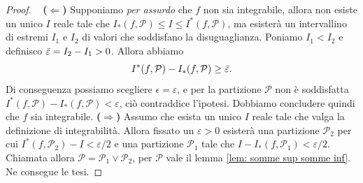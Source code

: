 \documentclass[10pt]{article}
\theoremstyle{plain}
\theoremstyle{definition}
\begin{document}
 \begin{proof} \
 \newline
 \textbf{($\Leftarrow$)} Supponiamo \textit{per assurdo} che $f$ non sia integrabile, allora non esiste un unico $I$ reale tale che $I_*(f,\mathcal{P})\leq I \leq I^*(f,\mathcal{P})$, ma esisterà un intervallino di estremi $I_1$ e $I_2$ di valori che soddisfano la disuguaglianza. Poniamo $I_1<I_2$ e definisco $\Bar{\varepsilon}=I_2-I_1>0$. Allora abbiamo
 $$ I^*(f,\mathcal{P})- I_*(f,\mathcal{P})\geq \Bar{\varepsilon}.$$ Di conseguenza possiamo scegliere $\epsilon=\varepsilon$, e per la partizione $\mathcal{P}$ non è soddisfatta $I^*(f,\mathcal{P})-I_*(f,\mathcal{P})<\varepsilon$, ciò contraddice l'ipotesi. Dobbiamo concludere quindi che $f$ sia integrabile.
\newline
 \textbf{($\Rightarrow$)} Assumo che esista un unico $I$ reale tale che valga la definizione di integrabilità. Allora fissato un $\varepsilon >0$ esisterà una partizione $\mathcal{P}_2$ per cui $I^*(f,\mathcal{P}_2)-I<\varepsilon/2$ e una partizione $\mathcal{P}_1$ tale che $I-I_*(f,\mathcal{P}_1)<\varepsilon/2$. Chiamata allora $\mathcal{P}=\mathcal{P}_1\vee\mathcal{P}_2$, per $\mathcal{P}$ vale il lemma \ref{lem: somme sup somme inf}. Ne consegue le tesi.
 \end{proof} 
\end{document}
